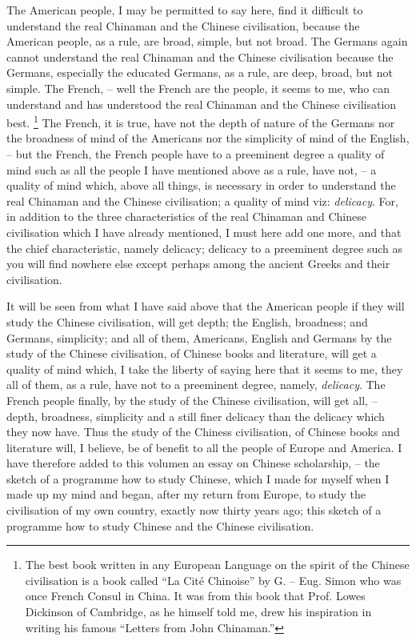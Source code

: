 The American people, I may be permitted to say here,
find it difficult to understand the real Chinaman and the Chinese civilisation,
because the American people, as a rule, are broad, simple, but not broad.
The Germans again cannot understand the real Chinaman and the Chinese civilisation because the Germans, especially the educated Germans, as a rule, are deep, broad, but not simple.
The French, -- well the French are the people, it seems to me, who can understand 
and has understood the real Chinaman and the Chinese civilisation best.
\footnote{The best book written in any European Language on the spirit of the Chinese civilisation is a book
called ``La Cit\'e Chinoise'' by G. -- Eug. Simon who was once French Consul in China.
It was from this book that Prof. Lowes Dickinson of Cambridge, as he himself told me,
drew his inspiration in writing his famous ``Letters from John Chinaman.''}
The French, it is true, have not the depth of nature of the Germans nor the broadness of mind of the Americans nor the simplicity of mind of the English,
-- but the French, the French people have to a preeminent degree a quality of mind
such as all the people I have mentioned above as a rule, have not,
-- a quality of mind which, above all things, is necessary in order to understand the real Chinaman and the Chinese civilisation;
a quality of mind viz: \emph{delicacy}.
For, in addition to the three characteristics of the real Chinaman and Chinese civilisation
which I have already mentioned,
I must here add one more, and that the chief characteristic, namely delicacy;
delicacy to a preeminent degree such as you will find nowhere else except perhaps among the ancient Greeks and their civilisation.

It will be seen from what I have said above that the American people if they will study the Chinese civilisation, will get depth;
the English, broadness; and Germans, simplicity;
and all of them, Americans, English and Germans by the study of the Chinese civilisation, of Chinese books and literature, will get a quality of mind which,
I take the liberty of saying here that it seems to me, they all of them, as a rule,
have not to a preeminent degree, namely, \emph{delicacy}.
The French people finally, by the study of the Chinese civilisation,
will get all, -- depth, broadness, simplicity and a still finer delicacy than the delicacy which they now have.
Thus the study of the Chiness civilisation, of Chinese books and literature will,
I believe, be of benefit to all the people of Europe and America.
I have therefore added to this volumen an essay on Chinese scholarship, -- the sketch of a programme how to study Chinese, which I made for myself when I made up my mind and began,
after my return from Europe, to study the civilisation of my own country,
exactly now thirty years ago;
this sketch of a programme how to study Chinese and the Chinese civilisation.

